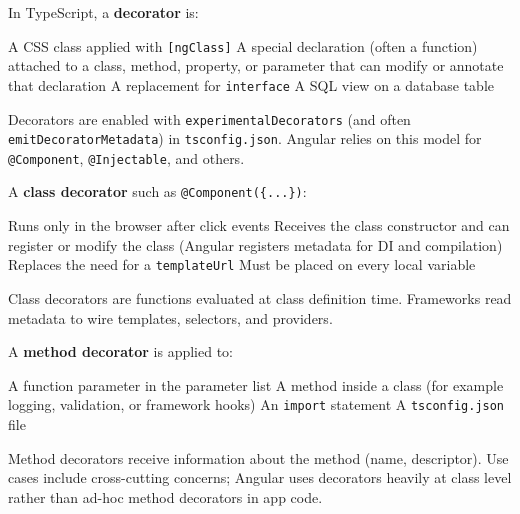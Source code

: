 \question[4]
In TypeScript, a \textbf{decorator} is:
\begin{choices}
  \choice A CSS class applied with \lstinline[style=htmlinline]|[ngClass]|
  \CorrectChoice A special declaration (often a function) attached to a class, method, property, or parameter that can modify or annotate that declaration
  \choice A replacement for \lstinline[style=tsinline]|interface|
  \choice A SQL view on a database table
\end{choices}
\begin{solution}
  Decorators are enabled with \texttt{experimentalDecorators} (and often \texttt{emitDecoratorMetadata}) in \texttt{tsconfig.json}. Angular relies on this model for \lstinline[style=tsinline]|@Component|, \lstinline[style=tsinline]|@Injectable|, and others.
\end{solution}

\question[4]
A \textbf{class decorator} such as \lstinline[style=tsinline]|@Component({...})|:
\begin{choices}
  \choice Runs only in the browser after click events
  \CorrectChoice Receives the class constructor and can register or modify the class (Angular registers metadata for DI and compilation)
  \choice Replaces the need for a \texttt{templateUrl}
  \choice Must be placed on every local variable
\end{choices}
\begin{solution}
  Class decorators are functions evaluated at class definition time. Frameworks read metadata to wire templates, selectors, and providers.
\end{solution}

\question[4]
A \textbf{method decorator} is applied to:
\begin{choices}
  \choice A function parameter in the parameter list
  \CorrectChoice A method inside a class (for example logging, validation, or framework hooks)
  \choice An \lstinline[style=tsinline]|import| statement
  \choice A \texttt{tsconfig.json} file
\end{choices}
\begin{solution}
  Method decorators receive information about the method (name, descriptor). Use cases include cross-cutting concerns; Angular uses decorators heavily at class level rather than ad-hoc method decorators in app code.
\end{solution}

